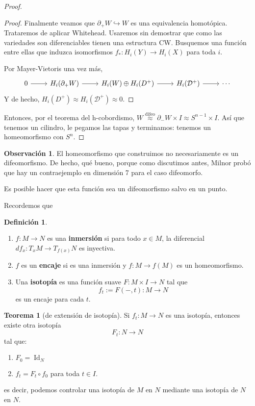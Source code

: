 \documentclass[spanish]{book}
\theoremstyle{definition}
\newtheorem*{defn}{Definición}
\newtheorem*{obs}{Observación}
\newtheorem*{teo}{Teorema}
\DeclareMathOperator{\Id}{Id}
\begin{document}
\begin{proof}
\begin{proof}
		Finalmente veamos que $\partial_+W\hookrightarrow W$ es una equivalencia homotópica. Trataremos de aplicar Whitehead. Usaremos sin demostrar que como las variedades son diferenciables tienen una estructura CW. Busquemos una función entre ellas que induzca isomorfismos $f_*:H_i(Y)\to H_i(X)$ para toda $i$.
		
		Por Mayer-Vietoris una vez más,
		\[\begin{tikzcd}
			0\arrow[r]&H_i(\partial_+W)\arrow[r]&H_i(W)\oplus H_i(D^+)\arrow[r]&H_i(\mathcal{D}^+)\arrow[r]&\cdots
		\end{tikzcd}\]
		Y de hecho, $H_i(D^+)\approx H_i(\mathcal{D}^+)\approx0$.
	\end{proof}
	
	Entonces, por el teorema del h-cobordismo, $W\overset{\text{difeo}}{\approx}\partial_-W\times I\approx S^{n-1}\times I$. Así que tenemos un cilindro, le pegamos las tapas y terminamos: tenemos un homeomorfismo con $S^n$.
\end{proof}
\begin{obs}
	El homeomorfismo que construimos no necesariamente es un difeomorfismo. De hecho, qué bueno, porque como discutimos antes, Milnor probó que hay un contraejemplo en dimensión 7 para el caso difeomorfo.
	
	Es posible hacer que esta función sea un difeomorfismo salvo en un punto.
\end{obs}
Recordemos que
\begin{defn}\leavevmode
	\begin{enumerate}
		\item $f:M\to N$ es una \textbf{inmersión} si para todo $x\in M$, la diferencial $df_x:T_xM\to T_{f(x)}N$ es inyectiva.
		\item $f$ es un \textbf{encaje} si es una inmersión y $f:M\to f(M)$ es un homeomorfismo.
		\item Una \textbf{isotopía} es una función suave $F:M\times I\to N$ tal que
		\[f_t:=F(-,t):M\to N\]
		es un encaje para cada $t$.
	\end{enumerate}
\end{defn}

\begin{teo}[de extensión de isotopía]
	Si $f_t:M\to N$ es una isotopía, entonces existe otra isotopía
	\[F_t:N\to N\]
	tal que:
	\begin{enumerate}
		\item $F_0=\Id_N$
		\item $f_t=F_t\circ f_0$ para toda $t\in I$.
	\end{enumerate}
	es decir, podemos controlar una isotopía de $M$ en $N$ mediante una isotopía de $N$ en $N$.
\end{teo}
\end{document}
